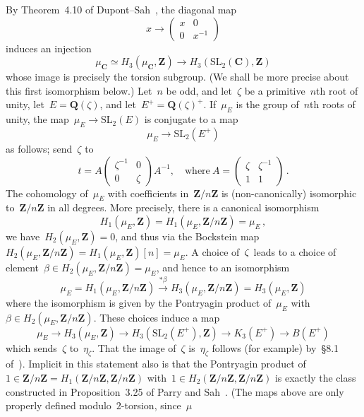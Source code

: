 \documentclass[12pt,reqno]{amsart}
\theoremstyle{definition}
\def\Q{\mathbf Q}   %
\def\Z{\mathbf Z}   %
\def\C{\mathbf C}   %
\def\SL{\mathrm{SL}}
\def\SL{\mathrm{SL}}
\begin{document}
By Theorem~4.10 of Dupont--Sah~\cite{DS}, the diagonal map
$$
x \rightarrow \left( \begin{matrix} x& 0 \\
0 & x^{-1} \end{matrix} \right)
$$
induces an injection
$$
\mu_{\C} \simeq H_3(\mu_{\C},\Z) \rightarrow H_3(\SL_2(\C),\Z)
$$
whose image is precisely the torsion subgroup. (We shall be more precise 
about this first isomorphism below.) Let~$n$ be odd, and
let~$\zeta$ be a primitive~$n$th root of unity,   let~$E = \Q(\zeta)$, and 
let~$E^{+} = \Q(\zeta)^{+}$. If~$\mu_E$ is the group of~$n$th roots of unity, 
the map~$\mu_E \rightarrow \SL_2(E)$ is conjugate
to a map
$$
\mu_E \rightarrow \SL_2(E^{+})
$$
as follows;
send~$\zeta$ to
$$
t = A \left( \begin{matrix} \zeta^{-1} & 0 \\
0 & \zeta \end{matrix} \right) A^{-1},
\quad \text{where} \  A =  \left(\begin{matrix} \zeta & \zeta^{-1} \\
1 & 1 \end{matrix} \right) \,.
$$
The cohomology of~$\mu_E$ with coefficients in~$\Z/n\Z$ is (non-canonically) 
isomorphic to~$\Z/n\Z$ in all degrees. More precisely, there is a canonical 
isomorphism
$$
H_1(\mu_E,\Z) = H_1(\mu_E,\Z/n\Z) = \mu_E \,,
$$
we have~$H_2(\mu_E,\Z) = 0$, and thus via the Bockstein map
$H_2(\mu_E,\Z/n\Z) = H_1(\mu_E,\Z)[n] = \mu_E$. 
A choice of~$\zeta$ leads to a choice of element~$\beta \in H_2(\mu_E,\Z/n\Z)  
= \mu_E$, and hence to an isomorphism
$$
\mu_E  = H_1(\mu_E,\Z/n\Z)  \stackrel{* \beta}{\longrightarrow}  
H_3(\mu_E,\Z/n \Z) = H_3(\mu_E,\Z)
$$
where the isomorphism is given by the Pontryagin product of~$\mu_E$ 
with~$\beta \in H_2(\mu_E,\Z/n\Z)$.
These choices induce a map
$$
\displaystyle{\mu_E \rightarrow  H_3(\mu_E,\Z) \rightarrow 
H_3(\SL_2(E^{+}),\Z) \rightarrow K_3(E^{+}) \rightarrow B(E^{+})}
$$
which sends~$\zeta$ to~$\eta_{\zeta}$. That the image of~$\zeta$ 
is~$\eta_{\zeta}$ follows (for example) by~\S8.1 of~\cite{Zickert}). Implicit 
in this statement also is that the Pontryagin product 
of~$1 \in \Z/n\Z = H_1(\Z/n\Z,\Z/ n \Z)$ with~$1 \in H_2(\Z/n\Z,\Z/n \Z)$ is 
exactly the class constructed in Proposition~3.25 of Parry and Sah~\cite{PS}.
(The maps above are only properly defined  modulo~$2$-torsion, since~$\mu$
\end{document}
